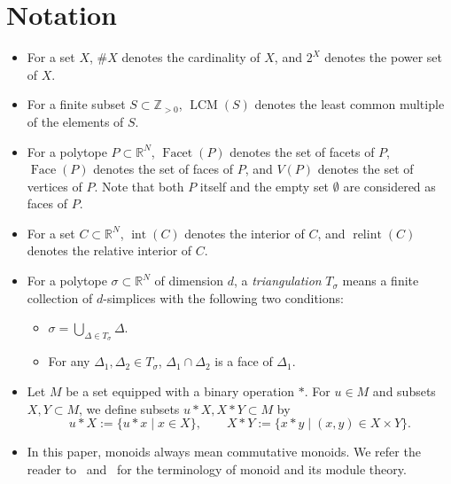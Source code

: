 \documentclass[11pt]{article}
\theoremstyle{definition}
\numberwithin{equation}{section}
\begin{document}
\section{Notation}\label{section:notation}
\begin{itemize}
\item 
For a set $X$, $\# X$ denotes the cardinality of $X$, and $2 ^X$ denotes the power set of $X$. 


\item
For a finite subset $S \subset \mathbb{Z}_{>0}$, $\operatorname{LCM}(S)$ denotes the least common multiple of the elements of $S$. 

\item 
For a polytope $P \subset \mathbb{R}^N$, 
$\operatorname{Facet}(P)$ denotes the set of facets of $P$, 
$\operatorname{Face}(P)$ denotes the set of faces of $P$, and 
$V(P)$ denotes the set of vertices of $P$. 
Note that both $P$ itself and the empty set $\emptyset$ are considered as faces of $P$. 

\item 
For a set $C \subset \mathbb{R}^N$, 
$\operatorname{int}(C)$ denotes the interior of $C$, and 
$\operatorname{relint}(C)$ denotes the relative interior of $C$. 

\item
For a polytope $\sigma \subset \mathbb{R}^N$ of dimension $d$, 
a \textit{triangulation} $T_{\sigma}$ means a finite collection of $d$-simplices with the following two conditions: 
\begin{itemize}
\item $\sigma = \bigcup _{\Delta \in T_{\sigma}} \Delta$. 
\item For any $\Delta _1, \Delta _2 \in T_{\sigma}$, $\Delta _1 \cap \Delta _2$ is a face of $\Delta _1$. 
\end{itemize}

\item 
Let $M$ be a set equipped with a binary operation $*$. 
For $u \in M$ and subsets $X, Y \subset M$, we define subsets $u * X, X * Y \subset M$ by
\[
u * X := \{ u * x \mid x \in X \}, \qquad
X * Y := \{ x * y \mid (x,y) \in X \times Y \}. 
\]

\item
In this paper, monoids always mean commutative monoids. 
We refer the reader to~\cite{BG2009} and~\cite{NSMN21} for the terminology of monoid and its module theory. 

\end{itemize}
\end{document}
